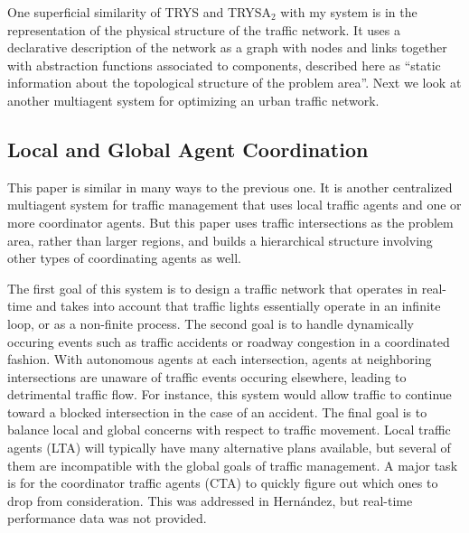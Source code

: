 \documentclass[11pt,letterpaper,onecolumn,twoside,openright,draft]{report}
\begin{document}
One superficial similarity of TRYS and TRYSA$_{2}$ with my system is in the representation of the physical structure of the traffic network.
It uses a declarative description of the network as a graph with nodes and links together with abstraction functions associated to components, described here as ``static information about the topological structure of the problem area''.
Next we look at another multiagent system for optimizing an urban traffic network.

\subsection{Local and Global Agent Coordination}
This paper\cite{france2003mso} is similar in many ways to the previous one.
It is another centralized multiagent system for traffic management that uses local traffic agents and one or more coordinator agents.
But this paper uses traffic intersections as the problem area, rather than larger regions, and builds a hierarchical structure involving other types of coordinating agents as well.

The first goal of this system is to design a traffic network that operates in real-time and takes into account that traffic lights essentially operate in an infinite loop, or as a non-finite process.
The second goal is to handle dynamically occuring events such as traffic accidents or roadway congestion in a coordinated fashion.
With autonomous agents at each intersection, agents at neighboring intersections are unaware of traffic events occuring elsewhere, leading to detrimental traffic flow.
For instance, this system would allow traffic to continue toward a blocked intersection in the case of an accident.
The final goal is to balance local and global concerns with respect to traffic movement.
Local traffic agents (LTA) will typically have many alternative plans available, but several of them are incompatible with the global goals of traffic management.
A major task is for the coordinator traffic agents (CTA) to quickly figure out which ones to drop from consideration.
This was addressed in Hern\'{a}ndez, but real-time performance data was not provided.
\end{document}
